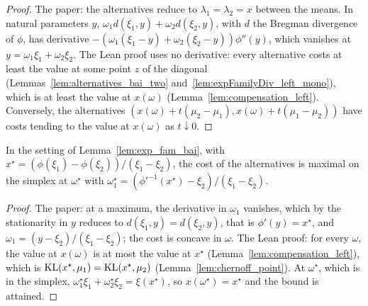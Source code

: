 \begin{proof}
  \leanok
  The paper: the alternatives reduce to $\lambda_1 = \lambda_2 = x$ between the means. In natural
  parameters $y$, $\omega_1 d(\xi_1, y) + \omega_2 d(\xi_2, y)$, with $d$ the Bregman divergence of
  $\phi$, has derivative $-(\omega_1 (\xi_1 - y) + \omega_2 (\xi_2 - y)) \phi''(y)$, which vanishes
  at $y = \omega_1 \xi_1 + \omega_2 \xi_2$. The Lean proof uses no derivative: every alternative
  costs at least the value at some point $z$ of the diagonal (Lemmas~\ref{lem:alternatives_bai_two}
  and~\ref{lem:expFamilyDiv_left_mono}), which is at least the value at $x(\omega)$
  (Lemma~\ref{lem:compensation_left}). Conversely, the alternatives $(x(\omega) + t (\mu_2 - \mu_1),
  x(\omega) + t (\mu_1 - \mu_2))$ have costs tending to the value at $x(\omega)$ as $t \downarrow 0$.
\end{proof}

\begin{lemma}[{\cite[Lemma 19]{D23}}]
  \label{lem:exp_fam_bai_max}
  \leanok
  In the setting of Lemma~\ref{lem:exp_fam_bai}, with $x^{\star} = (\phi(\xi_1) - \phi(\xi_2)) /
  (\xi_1 - \xi_2)$, the cost of the alternatives is maximal on the simplex at $\omega^{\star}$ with
  $\omega^{\star}_1 = (\phi'^{-1}(x^{\star}) - \xi_2) / (\xi_1 - \xi_2)$.
\end{lemma}

\begin{proof}
  \leanok
  The paper: at a maximum, the derivative in $\omega_1$ vanishes, which by the stationarity in $y$
  reduces to $d(\xi_1, y) = d(\xi_2, y)$, that is $\phi'(y) = x^{\star}$, and $\omega_1 = (y -
  \xi_2) / (\xi_1 - \xi_2)$; the cost is concave in $\omega$. The Lean proof: for every $\omega$,
  the value at $x(\omega)$ is at most the value at $x^{\star}$ (Lemma~\ref{lem:compensation_left}),
  which is $\mathrm{KL}(x^{\star}, \mu_1) = \mathrm{KL}(x^{\star}, \mu_2)$ (Lemma~\ref{lem:chernoff_point}). At
  $\omega^{\star}$, which is in the simplex, $\omega^{\star}_1 \xi_1 + \omega^{\star}_2 \xi_2 =
  \xi(x^{\star})$, so $x(\omega^{\star}) = x^{\star}$ and the bound is attained.
\end{proof}

